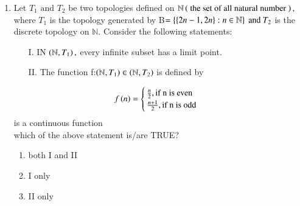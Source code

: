 \documentclass[journal]{IEEEtran}
\begin{document}
\begin{enumerate} [start=40]
\begin{itemize}
    \item[II.] The range space of T  is spanned by the set $\cbrak{1+x^{2},1+x}$.
    
    \item[III.] $\text{T}\brak{\text{T}\brak{1+x}}=1+x^{2}$.
    
    \item[IV.] If M is the matrix representation of T with respect to the standard basis $\cbrak{1,x,x^{2}}$ of $P_{2}$, then the trace of the matrix M is 3.
\end{itemize}
Which of the above statement are TRUE?
\begin{multicols}{2}
    \begin{enumerate}
         \item I and II only 
         \item I ,III and IV only 
         \item I ,II and IV only 
        \item  II and IV only 
    \end{enumerate}
\end{multicols}   
\bigskip
\item Let $T_{1}\text{ and }T_{2}$ be two topologies defined on $\mathbb{N}\left(\text{ the set of all natural number }\right),$ where $T_{1}$ is the topology  generated by B$=\left\{\left\{2n-1,2n\right\}:n\in \mathbb{N}\right\}\text{ and }T_{2}$ is the discrete  topology on $\mathbb{N}$.
Consider the following  statements:
\begin{itemize}
    \item [I.] IN $\left(\mathbb{N},T_{1}\right),$ every infinite subset has a limit point.
    \item [II.] The function f:$\left(\mathbb{N},T_{1}\right)\in\left(\mathbb{N},T_{2}\right)$ is defined by
\end{itemize}
\begin{align*}
    f\left(n\right)=\begin{cases} 
    \frac{n}{2},\text{if n is even}\\
    \frac{n+1}{2},\text{if n is odd}
\end{cases}
\end{align*}
is a continuous function\\
which of the above statement is/are TRUE?
\begin{multicols}{2}
    \begin{enumerate}
         \item  both I and II  
         \item I  only 
         \item II  only 

\end{enumerate}
\end{multicols}
\end{enumerate}
\end{document}
